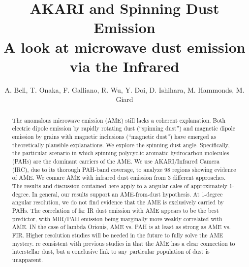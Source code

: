 \documentclass[preprint2,longabstract]{aastex}
\begin{document}

\title{AKARI and Spinning Dust Emission\\
A look at microwave dust emission via the Infrared}



\author{A. Bell, T. Onaka, F. Galliano, R. Wu, Y. Doi, D. Ishihara, M. Hammonds, M. Giard}


\begin{abstract}
The anomalous microwave emission (AME) still lacks a coherent explanation. Both electric dipole emission by rapidly rotating dust (``spinning dust'') and magnetic dipole emission by grains with magnetic inclusions (``magnetic dust'') have emerged as theoretically plausible explanations. We explore the spinning dust angle. Specifically, the particular scenario in which spinning polycyclic aromatic hydrocarbon molecules (PAHs) are the dominant carriers of the AME. We use AKARI/Infrared Camera (IRC), due to its thorough PAH-band coverage, to analyze 98 regions showing evidence of AME.   We comare AME with infrared dust emission from 3 different approaches. The results and discussion contained here apply to a angular cales of approximately 1-degree. In general, our results support an AME-from-dust hypothesis. At 1-degree angular resolution, we do not find evidence that the AME is exclusively carried by PAHs. The correlation of far IR dust emission with AME appears to be the best predictor, with MIR/PAH emission being marginally more weakly correlated with AME. IN the case of lambda Orionis, AME vs. PAH is at least as strong as AME vs. FIR. Higher resolution studies will be needed in the future to fully solve the AME mystery. re consistent with previous studies in that the AME has a clear connection to interstellar dust, but a conclusive link to any particular population of dust is unapparent.
\end{abstract}
\end{document}
